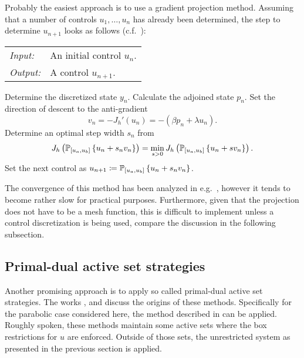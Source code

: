 \documentclass[../thesis.tex]{subfiles}
\begin{document}
Probably the easiest approach is to use a gradient projection method.
Assuming that a number of controls $u_1, \ldots, u_n$ has already been determined, the step to determine $u_{n+1}$ looks as follows (c.f.\ \cite{Troeltzsch}):
\begin{algorithmbox}
\begin{tabular}{@{}ll}
\textit{Input:} & An initial control $u_n$. \\
\textit{Output:} & A control $u_{n+1}$.
\end{tabular}
\end{algorithmbox}
\vspace{-10pt}
\begin{algorithm}
Determine the discretized state $y_n$.\;
Calculate the adjoined state $p_n$.\;
Set the direction of descent to the anti-gradient
\[
	v_n = -J_h'(u_n) = - (\beta p_n + \lambda u_n).
\]\;
\vspace{-15pt}
Determine an optimal step width $s_n$ from
\[
	J_h \left( \mathbb{P}_{[u_a, u_b]} \left\{ u_n + s_n v_n \right\} \right) = \min_{s > 0} J_h \left( \mathbb{P}_{[u_a, u_b]} \left\{ u_n + s v_n \right\} \right).
\]\;
\vspace{-15pt}
Set the next control as $u_{n+1} \coloneqq \mathbb{P}_{[u_a, u_b]} \left\{ u_n + s_n v_n \right\}$.
\end{algorithm}
\vspace{-4pt}
\EndAlgorithmLine
The convergence of this method has been analyzed in e.g.\ \cite{HinzePinnauUlbrich}, however it tends to become rather slow for practical purposes.
Furthermore, given that the projection does not have to be a mesh function, this is difficult to implement unless a control discretization is being used, compare the discussion in the following subsection.
\subsection{Primal-dual active set strategies}
\label{sec:KR-numerics}
Another promising approach is to apply so called primal-dual active set strategies. The works \cite{ItoKunisch-2000}, \cite{ItoKunisch} and \cite{BergouniouxItoKunisch} discuss the origins of these methods. Specifically for the parabolic case considered here, the method described in \cite{KunischRoesch} can be applied.
Roughly spoken, these methods maintain some active sets where the box restrictions for $u$ are enforced. Outside of those sets, the unrestricted system as presented in the previous section is applied.
\end{document}
